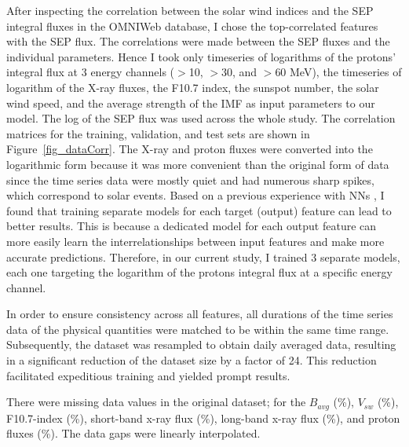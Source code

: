 After inspecting the correlation between the solar wind indices and the SEP integral fluxes in the OMNIWeb database, I chose the top-correlated features with the SEP flux. The correlations were made between the SEP fluxes and the individual parameters. Hence I took only timeseries of logarithms of the protons' integral flux at 3 energy channels ($>$10, $>$30, and $>$60 MeV), the timeseries of logarithm of the X-ray fluxes, the F10.7 index, the sunspot number, the solar wind speed, and the average strength of the IMF as input parameters to our model.
The log of the SEP flux was used across the whole study.
The correlation matrices for the training, validation, and test sets are shown in Figure~\ref{fig_dataCorr}.
The X-ray and proton fluxes were converted into the logarithmic form because it was more convenient than the original form of data since the time series data were mostly quiet and had numerous sharp spikes, which correspond to solar events.
Based on a previous experience with NNs \citep{mnedal_2019}, I found that training separate models for each target (output) feature can lead to better results. This is because a dedicated model for each  output feature can more easily learn the interrelationships between input features and make more accurate predictions. Therefore, in our current study, I trained 3 separate models, each one targeting the logarithm of the protons integral flux at a specific energy channel.

In order to ensure consistency across all features, all durations of the time series data of the physical quantities were matched to be within the same time range. Subsequently, the dataset was resampled to obtain daily averaged data, resulting in a significant reduction of the dataset size by a factor of 24. This reduction facilitated expeditious training and yielded prompt results.

There were missing data values in the original dataset; for the $B_{avg}$ (\%), $V_{sw}$ (\%), F10.7-index (\%), short-band x-ray flux (\%), long-band x-ray flux (\%), and proton fluxes (\%). The data gaps were linearly interpolated.

